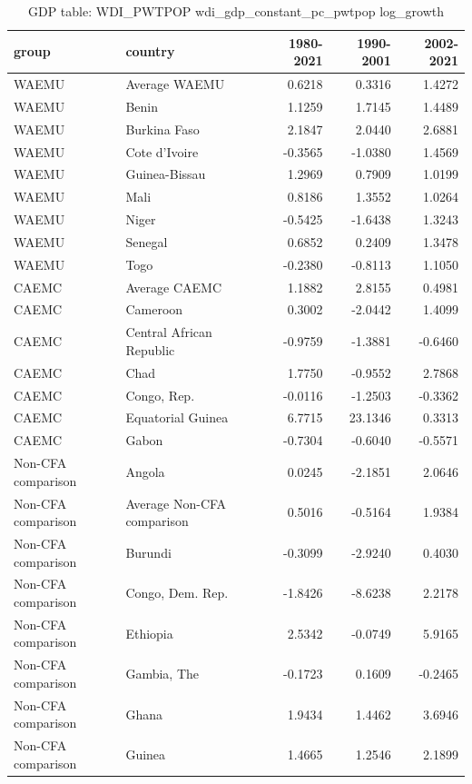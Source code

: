 \begin{table}

\caption{GDP table: WDI_PWTPOP wdi_gdp_constant_pc_pwtpop log_growth}
\centering
\begin{tabular}[t]{llrrr}
\toprule
group & country & 1980-2021 & 1990-2001 & 2002-2021\\
\midrule
WAEMU & Average WAEMU & 0.6218 & 0.3316 & 1.4272\\
WAEMU & Benin & 1.1259 & 1.7145 & 1.4489\\
WAEMU & Burkina Faso & 2.1847 & 2.0440 & 2.6881\\
WAEMU & Cote d'Ivoire & -0.3565 & -1.0380 & 1.4569\\
WAEMU & Guinea-Bissau & 1.2969 & 0.7909 & 1.0199\\
\addlinespace
WAEMU & Mali & 0.8186 & 1.3552 & 1.0264\\
WAEMU & Niger & -0.5425 & -1.6438 & 1.3243\\
WAEMU & Senegal & 0.6852 & 0.2409 & 1.3478\\
WAEMU & Togo & -0.2380 & -0.8113 & 1.1050\\
CAEMC & Average CAEMC & 1.1882 & 2.8155 & 0.4981\\
\addlinespace
CAEMC & Cameroon & 0.3002 & -2.0442 & 1.4099\\
CAEMC & Central African Republic & -0.9759 & -1.3881 & -0.6460\\
CAEMC & Chad & 1.7750 & -0.9552 & 2.7868\\
CAEMC & Congo, Rep. & -0.0116 & -1.2503 & -0.3362\\
CAEMC & Equatorial Guinea & 6.7715 & 23.1346 & 0.3313\\
\addlinespace
CAEMC & Gabon & -0.7304 & -0.6040 & -0.5571\\
Non-CFA comparison & Angola & 0.0245 & -2.1851 & 2.0646\\
Non-CFA comparison & Average Non-CFA comparison & 0.5016 & -0.5164 & 1.9384\\
Non-CFA comparison & Burundi & -0.3099 & -2.9240 & 0.4030\\
Non-CFA comparison & Congo, Dem. Rep. & -1.8426 & -8.6238 & 2.2178\\
\addlinespace
Non-CFA comparison & Ethiopia & 2.5342 & -0.0749 & 5.9165\\
Non-CFA comparison & Gambia, The & -0.1723 & 0.1609 & -0.2465\\
Non-CFA comparison & Ghana & 1.9434 & 1.4462 & 3.6946\\
Non-CFA comparison & Guinea & 1.4665 & 1.2546 & 2.1899\\

\end{tabular}
\end{table}
